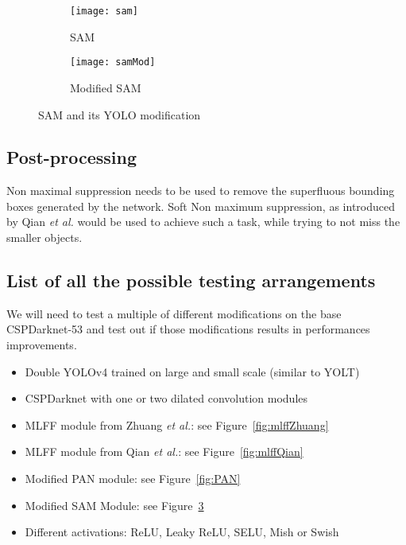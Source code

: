 \begin{figure}[H]
     \centering
     \begin{subfigure}[b]{0.4\textwidth}
         \centering
         \texttt{[image: sam]}
         \caption{SAM}
         \label{fig:samnorm}
     \end{subfigure}
     \begin{subfigure}[b]{0.4\textwidth}
         \centering
         \texttt{[image: samMod]}
         \caption{Modified SAM}
         \label{fig:samod}
     \end{subfigure}
   \caption{SAM and its YOLO modification}
  \label{fig:SAM}
\end{figure}

\subsection{Post-processing}
Non maximal suppression needs to be used to remove the superfluous bounding boxes generated by the network. Soft Non maximum suppression, as introduced by Qian \textit{et al.} \cite{qianAl} would be used to achieve such a task, while trying to not miss the smaller objects.


\subsection{List of all the possible testing arrangements}
We will need to test a multiple of different modifications on the base CSPDarknet-53 and test out if those modifications results in performances improvements.
\begin{itemize}
	\item Double YOLOv4 trained on large and small scale (similar to YOLT\cite{yolt})
	\item CSPDarknet with one or two dilated convolution modules
	\item MLFF module from Zhuang \textit{et al.}: see Figure~\ref{fig:mlffZhuang}
	\item MLFF module from Qian \textit{et al.}: see Figure~\ref{fig:mlffQian}
	\item Modified PAN module: see Figure~\ref{fig:PAN}
	\item Modified SAM Module: see Figure~\ref{fig:SAM}
	\item Different activations: ReLU, Leaky ReLU, SELU, Mish or Swish
\end{itemize}

